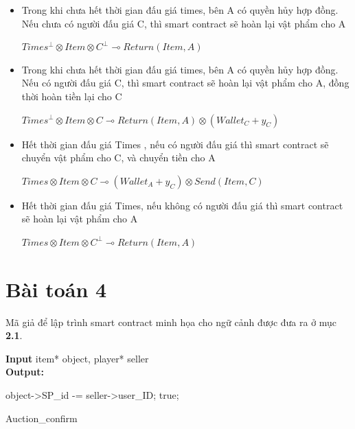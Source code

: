 \documentclass[a4paper]{article}
\begin{document}
\begin{itemize}
    \item Trong khi chưa hết thời gian đấu giá times, bên A có quyền hủy hợp đồng. Nếu chưa có người đấu giá C, thì smart contract sẽ hoàn lại vật phẩm cho A
    \begin{center}
        $Times^{\bot} \otimes Item \otimes C^{\bot} \multimap Return(Item,A)$
    \end{center}
    
    \item Trong khi chưa hết thời gian đấu giá times, bên A có quyền hủy hợp đồng. Nếu có người đấu giá C, thì smart contract sẽ hoàn lại vật phẩm cho A, đồng thời hoàn tiền lại cho C\\
    \begin{center}
        $Times^{\bot} \otimes Item \otimes C \multimap Return(Item, A) \otimes (Wallet_{C} + y_{C})$ 
    \end{center}
    
    \item Hết thời gian đấu giá Times , nếu có người đấu giá thì smart contract sẽ chuyển vật phẩm cho C, và chuyển tiền cho A\\
    \begin{center}
        $Times \otimes Item \otimes C \multimap (Wallet_{A} + y_{C}) \otimes Send(Item,C)$
    \end{center}
    
    \item Hết thời gian đấu giá Times, nếu không có người đấu giá thì smart contract sẽ hoàn lại vật phẩm cho A\\
    \begin{center}
        $Times \otimes Item \otimes C^{\bot} \multimap Return(Item,A)$
    \end{center}
\end{itemize}

\section{Bài toán 4}
Mã giả để lập trình smart contract minh họa cho ngữ cảnh được đưa ra ở mục \textbf{2.1}.\\



\begin{algorithm}
 \textbf{Input} item* object, player* seller\\
 \textbf{Output:}\\
 \begin{algorithmic}
    \State object->SP\_id  -= seller->user\_ID;
    \State \Return true;
 \end{algorithmic}
 \caption{Auction\_confirm}
\end{algorithm}
\end{document}
